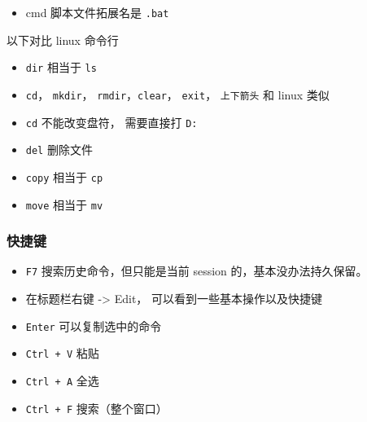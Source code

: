 
\begin{issues}
\issueDraft
\end{issues}

\begin{itemize}
\item cmd 脚本文件拓展名是 \verb`.bat`
\end{itemize}

以下对比 linux 命令行
\begin{itemize}
\item \verb`dir` 相当于 \verb`ls`
\item \verb`cd`， \verb`mkdir`， \verb`rmdir`，\verb`clear`， \verb`exit`， \verb`上下箭头` 和 linux 类似
\item \verb`cd` 不能改变盘符， 需要直接打 \verb`D:`
\item \verb`del` 删除文件
\item \verb`copy` 相当于 \verb`cp`
\item \verb`move` 相当于 \verb`mv`
\end{itemize}

\subsubsection{快捷键}
\begin{itemize}
\item \verb`F7` 搜索历史命令，但只能是当前 session 的，基本没办法持久保留。
\item 在标题栏右键 -> Edit， 可以看到一些基本操作以及快捷键
\item \verb`Enter` 可以复制选中的命令
\item \verb`Ctrl + V` 粘贴
\item \verb`Ctrl + A` 全选
\item \verb`Ctrl + F` 搜索（整个窗口）
\end{itemize}
